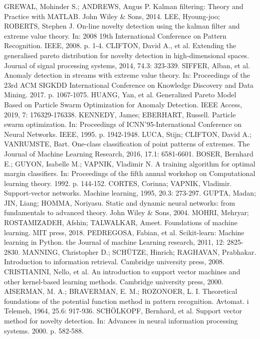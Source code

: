 \documentclass[11pt,twoside,openright]{report}
\begin{document}
\begin{thebibliography}{L}
GREWAL, Mohinder S.; ANDREWS, Angus P. Kalman filtering: Theory and Practice with MATLAB. John Wiley \& Sons, 2014.
LEE, Hyoung-joo; ROBERTS, Stephen J. On-line novelty detection using the kalman filter and extreme value theory. In: 2008 19th International Conference on Pattern Recognition. IEEE, 2008. p. 1-4.
CLIFTON, David A., et al. Extending the generalised pareto distribution for novelty detection in high-dimensional spaces. Journal of signal processing systems, 2014, 74.3: 323-339.
SIFFER, Alban, et al. Anomaly detection in streams with extreme value theory. In: Proceedings of the 23rd ACM SIGKDD International Conference on Knowledge Discovery and Data Mining. 2017. p. 1067-1075.
HUANG, Yan, et al. Generalized Pareto Model Based on Particle Swarm Optimization for Anomaly Detection. IEEE Access, 2019, 7: 176329-176338.
KENNEDY, James; EBERHART, Russell. Particle swarm optimization. In: Proceedings of ICNN'95-International Conference on Neural Networks. IEEE, 1995. p. 1942-1948.
LUCA, Stijn; CLIFTON, David A.; VANRUMSTE, Bart. One-class classification of point patterns of extremes. The Journal of Machine Learning Research, 2016, 17.1: 6581-6601.
BOSER, Bernhard E.; GUYON, Isabelle M.; VAPNIK, Vladimir N. A training algorithm for optimal margin classifiers. In: Proceedings of the fifth annual workshop on Computational learning theory. 1992. p. 144-152.
CORTES, Corinna; VAPNIK, Vladimir. Support-vector networks. Machine learning, 1995, 20.3: 273-297.
GUPTA, Madan; JIN, Liang; HOMMA, Noriyasu. Static and dynamic neural networks: from fundamentals to advanced theory. John Wiley \& Sons, 2004.
MOHRI, Mehryar; ROSTAMIZADEH, Afshin; TALWALKAR, Ameet. Foundations of machine learning. MIT press, 2018.
PEDREGOSA, Fabian, et al. Scikit-learn: Machine learning in Python. the Journal of machine Learning research, 2011, 12: 2825-2830.
MANNING, Christopher D.; SCHÜTZE, Hinrich; RAGHAVAN, Prabhakar. Introduction to information retrieval. Cambridge university press, 2008.
CRISTIANINI, Nello, et al. An introduction to support vector machines and other kernel-based learning methods. Cambridge university press, 2000.
AISERMAN, M. A.; BRAVERMAN, E. M.; ROZONOER, L. I. Theoretical foundations of the potential function method in pattern recognition. Avtomat. i Telemeh, 1964, 25.6: 917-936.
SCHÖLKOPF, Bernhard, et al. Support vector method for novelty detection. In: Advances in neural information processing systems. 2000. p. 582-588.

\end{thebibliography}
\end{document}
